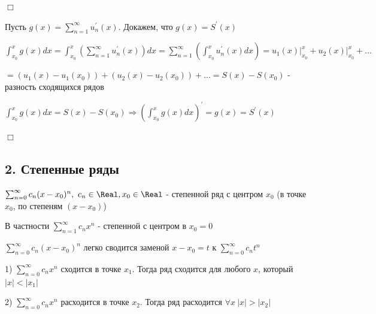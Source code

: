 \documentclass[12pt]{article}
\begin{document}
    
    \begin{MyProof}
        $\Box$

        Пусть $g(x) = \sum_{n = 1}^\infty u^\prime_n(x)$. Докажем, что $g(x) = S^\prime(x)$

        $\int_{x_0}^x g(x)dx = \int_{x_0}^x \left(\sum_{n = 1}^\infty u^\prime_n(x)\right) dx = \sum_{n = 1}^\infty 
        \left(\int_{x_0}^x u_n^\prime (x)dx\right) = u_1(x) \Big|_{x_0}^x + u_2(x) \Big|_{x_0}^x + \dots$

        $ = (u_1(x) - u_1(x_0)) + (u_2(x) - u_2(x_0)) + \dots = S(x) - S(x_0)$ - разность сходящихся рядов

        $\int_{x_0}^x g(x) dx = S(x) - S(x_0) \Longrightarrow \left(\int_{x_0}^x g(x) dx\right)^\prime = g(x) = S^\prime(x)$

        $\Box$
    \end{MyProof}

    \subsection{2. Степенные ряды}

    \hypertarget{powerseries}{}

    \Def $\sum_{n = 0}^\infty c_n(x - x_0)^n, \ c_n \in \Real, x_0 \in \Real$ - степенной ряд с центром $x_0$ (в точке $x_0$, по степеням $(x - x_0)$)

    \Nota В частности $\sum_{n = 1}^\infty c_n x^n$ - степенной с центром в $x_0 = 0$

    $\sum_{n = 0}^\infty c_n(x - x_0)^n$ легко сводится заменой $x - x_0 = t$ к $\sum_{n = 0}^\infty c_n t^n$

    \hypertarget{abelstheorem}{}

    \begin{MyTheorem}

        1) $\sum_{n = 0}^\infty c_n x^n$ сходится в точке $x_1$. Тогда ряд сходится для любого $x$, который $|x| < |x_1|$

        2) $\sum_{n = 0}^\infty c_n x^n$ расходится в точке $x_2$. Тогда ряд расходится $\forall x \ |x| > |x_2|$
    \end{MyTheorem}
\end{document}
